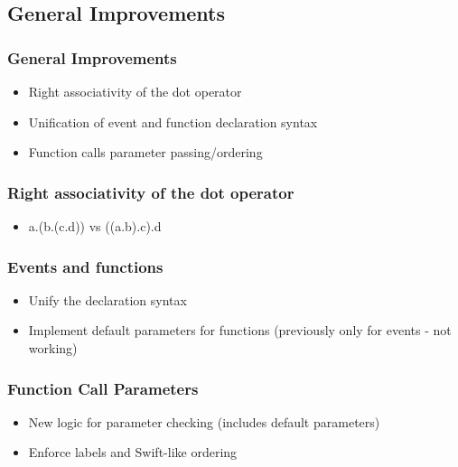 \documentclass{beamer}
\begin{document}
\subsection{General Improvements}

\begin{frame}
\frametitle{General Improvements}
\begin{itemize}
    \item Right associativity of the dot operator
    \item Unification of event and function declaration syntax
    \item Function calls parameter passing/ordering
\end{itemize}
\end{frame}

\begin{frame}
\frametitle{Right associativity of the dot operator}
\begin{itemize}
    \item a.(b.(c.d)) vs ((a.b).c).d
\end{itemize}
\end{frame}

\begin{frame}
\frametitle{Events and functions}
\begin{itemize}
    \item Unify the declaration syntax
    \item Implement default parameters for functions (previously only for events - not working)
\end{itemize}
\end{frame}

\begin{frame}
\frametitle{Function Call Parameters}
\begin{itemize}
    \item New logic for parameter checking (includes default parameters)
    \item Enforce labels and Swift-like ordering
\end{itemize}
\end{frame}
\end{document}
